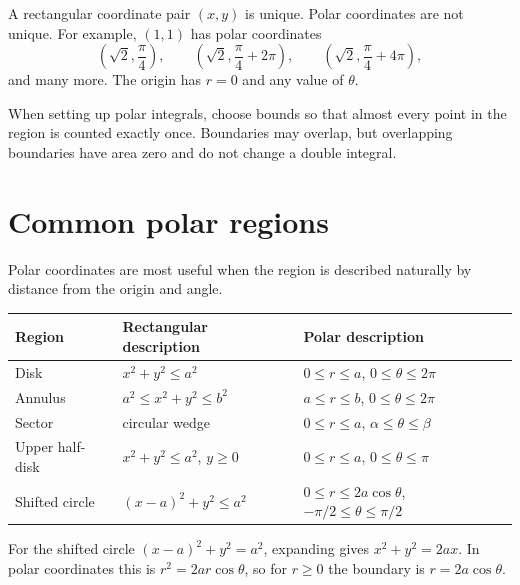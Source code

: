 \documentclass[11pt]{article}
\begin{document}
A rectangular coordinate pair $(x,y)$ is unique. Polar coordinates are not unique. For example, $(1,1)$ has polar coordinates
\[
\left(\sqrt2,\frac{\pi}{4}\right),\qquad
\left(\sqrt2,\frac{\pi}{4}+2\pi\right),\qquad
\left(\sqrt2,\frac{\pi}{4}+4\pi\right),
\]
and many more. The origin has $r=0$ and any value of $\theta$.

\begin{notebox}
When setting up polar integrals, choose bounds so that almost every point in the region is counted exactly once. Boundaries may overlap, but overlapping boundaries have area zero and do not change a double integral.
\end{notebox}

\section{Common polar regions}

Polar coordinates are most useful when the region is described naturally by distance from the origin and angle.

\begin{center}
\begin{tabular}{@{}lll@{}}
\toprule
Region & Rectangular description & Polar description \\
\midrule
Disk & $x^2+y^2\le a^2$ & $0\le r\le a$, $0\le\theta\le2\pi$ \\
Annulus & $a^2\le x^2+y^2\le b^2$ & $a\le r\le b$, $0\le\theta\le2\pi$ \\
Sector & circular wedge & $0\le r\le a$, $\alpha\le\theta\le\beta$ \\
Upper half-disk & $x^2+y^2\le a^2$, $y\ge0$ & $0\le r\le a$, $0\le\theta\le\pi$ \\
Shifted circle & $(x-a)^2+y^2\le a^2$ & $0\le r\le2a\cos\theta$, $-\pi/2\le\theta\le\pi/2$ \\
\bottomrule
\end{tabular}
\end{center}

For the shifted circle $(x-a)^2+y^2=a^2$, expanding gives $x^2+y^2=2ax$. In polar coordinates this is $r^2=2ar\cos\theta$, so for $r\ge0$ the boundary is $r=2a\cos\theta$.
\end{document}
